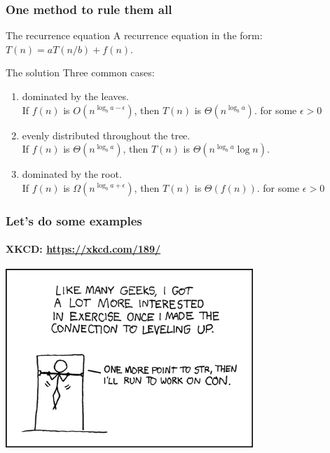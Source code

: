 \begin{frame}
	\frametitle{One method to rule them all}

	\begin{overlayarea}{\textwidth}{1.2\textheight}
		\begin{problemblock}{The recurrence equation}
			\scriptsize
			A recurrence equation in the form: $T(n) = a T(n/b) + f(n)$.
		\end{problemblock}
		
		\begin{answerblock}{The solution}
				\scriptsize
			Three common cases:
			\begin{enumerate}
				\item	dominated by \alert{the leaves}. \hfill\\
					If $f(n)$ is $O(n^{\log_b a - \epsilon})$, then $T(n)$ is $\Theta(n^{\log_b a})$. {\small\hfill for some $\epsilon > 0$}
				\item<2->	\alert{evenly distributed} throughout the tree.\hfill\\
					If $f(n)$ is $\Theta(n^{\log_b a})$, then $T(n)$ is $\Theta(n^{\log_b a} \log n)$. 
				\item<3->	dominated by \alert{the root}.\hfill\\
					If $f(n)$ is $\Omega(n^{\log_b a + \epsilon})$, then $T(n)$ is $ \Theta(f(n))$. {\small\hfill for some $\epsilon > 0$}
			\end{enumerate}	
		\end{answerblock}
	\end{overlayarea}
\end{frame}

\begin{frame}
	\frametitle{Let's do some examples}
	\framesubtitle{XKCD: \url{https://xkcd.com/189/}}

	\begin{center}
		\includegraphics[width=0.7\textwidth]{figures/exercise.png}
	\end{center}
\end{frame}

